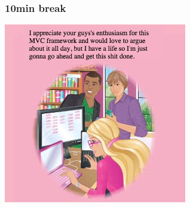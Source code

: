 \begin{frame} 
    \frametitle{10min break}
    \begin{center}
        \includegraphics[width=0.6\textwidth]{images/barbie3.png}
    \end{center}
\end{frame}


